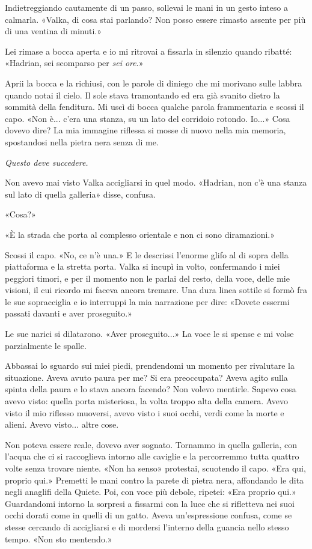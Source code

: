 Indietreggiando cautamente di un passo, sollevai le mani in un gesto
inteso a calmarla. «Valka, di cosa stai parlando? Non posso essere
rimasto assente per più di una ventina di minuti.»

Lei rimase a bocca aperta e io mi ritrovai a fissarla in silenzio quando
ribatté: «Hadrian, sei scomparso per \emph{sei ore}.»

Aprii la bocca e la richiusi, con le parole di diniego che mi morivano
sulle labbra quando notai il cielo. Il sole stava tramontando ed era già
svanito dietro la sommità della fenditura. Mi uscì di bocca qualche
parola frammentaria e scossi il capo. «Non è... c'era una stanza, su un
lato del corridoio rotondo. Io...» Cosa dovevo dire? La mia immagine
riflessa si mosse di nuovo nella mia memoria, spostandosi nella pietra
nera senza di me.

\emph{\label{fileintero-67.xhtml__idTextAnchor004}{}Questo
	deve succedere.}

Non avevo mai visto Valka accigliarsi in quel modo. «Hadrian, non c'è
una stanza sul lato di quella galleria» disse, confusa.

«Cosa?»

«È la strada che porta al complesso orientale e non ci sono
diramazioni.»

Scossi il capo. «No, ce n'è una.» E le descrissi l'enorme glifo al di
sopra della piattaforma e la stretta porta. Valka si incupì in volto,
confermando i miei peggiori timori, e per il momento non le parlai del
resto, della voce, delle mie visioni, il cui ricordo mi faceva ancora
tremare. Una dura linea sottile si formò fra le sue sopracciglia e io
interruppi la mia narrazione per dire: «Dovete essermi passati davanti e
aver proseguito.»

Le sue narici si dilatarono. «Aver proseguito...» La voce le si spense e
mi volse parzialmente le spalle.

Abbassai lo sguardo sui miei piedi, prendendomi un momento per
rivalutare la situazione. Aveva avuto paura per me? Si era preoccupata?
Aveva agito sulla spinta della paura e lo stava ancora facendo? Non
volevo mentirle. Sapevo cosa avevo visto: quella porta misteriosa, la
volta troppo alta della camera. Avevo visto il mio riflesso muoversi,
avevo visto i suoi occhi, verdi come la morte e alieni. Avevo visto...
altre cose.

Non poteva essere reale, dovevo aver sognato. Tornammo in quella
galleria, con l'acqua che ci si raccoglieva intorno alle caviglie e la
percorremmo tutta quattro volte senza trovare niente. «Non ha senso»
protestai, scuotendo il capo. «Era qui, proprio qui.» Premetti le mani
contro la parete di pietra nera, affondando le dita negli anaglifi della
Quiete. Poi, con voce più debole, ripetei: «Era proprio qui.»
Guardandomi intorno la sorpresi a fissarmi con la luce che si rifletteva
nei suoi occhi dorati come in quelli di un gatto. Aveva un'espressione
confusa, come se stesse cercando di accigliarsi e di mordersi l'interno
della guancia nello stesso tempo. «Non sto mentendo.»

